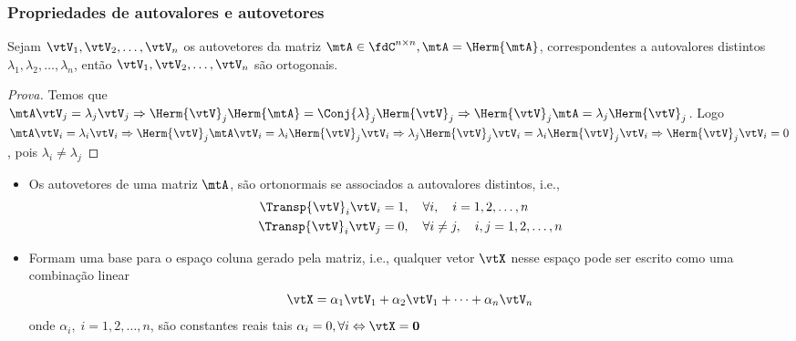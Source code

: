 \begin{frame}
  \frametitle{Propriedades de autovalores e autovetores}
  \vspace{-0.25\baselineskip}
  \begin{propriedade}
    Sejam  $\vtV_1, \vtV_2, \ldots, \vtV_n$ os autovetores da matriz $\mtA \in \fdC^{n \times n}, \mtA = \Herm{\mtA}$, correspondentes a autovalores distintos $\lambda_1, \lambda_2, \ldots, \lambda_n$, então $\vtV_1, \vtV_2, \ldots, \vtV_n$ são ortogonais.
  \end{propriedade}
  \vspace{-0.25\baselineskip}
  \begin{proof}[Prova]
    Temos que $\mtA \vtV_j = \lambda_j \vtV_j \Rightarrow \Herm{\vtV}_j \Herm{\mtA}  = \Conj{\lambda}_j \Herm{\vtV}_j \Rightarrow \Herm{\vtV}_j \mtA  = \lambda_j \Herm{\vtV}_j$. Logo \\
    $\mtA \vtV_i = \lambda_i \vtV_i \Rightarrow \Herm{\vtV}_j \mtA \vtV_i = \lambda_i \Herm{\vtV}_j \vtV_i \Rightarrow \lambda_j \Herm{\vtV}_j \vtV_i = \lambda_i \Herm{\vtV}_j \vtV_i \Rightarrow \Herm{\vtV}_j \vtV_i = 0$, pois $\lambda_i \neq \lambda_j$
  \end{proof}
  \begin{itemize}\footnotesize
    \item Os autovetores de uma matriz $\mtA$, são ortonormais se associados a autovalores distintos, i.e.,
      \begin{subequations}\label{u}
        \begin{align}
          \Transp{\vtV}_i\vtV_i &= 1, \quad \forall i, \quad i = 1,2,\ldots,n \label{eq_ortogonal}\\
          \Transp{\vtV}_i\vtV_j &= 0, \quad \forall i \neq j, \quad i,j = 1,2,\ldots,n \label{eq_normal}
        \end{align}
      \end{subequations}
    \item Formam uma base para o espaço coluna gerado pela matriz, i.e., qualquer vetor $\vtX$ nesse espaço pode ser escrito como uma combinação linear
    \begin{equation}\label{eq_comb_lin}
      \vtX = \alpha_1\vtV_1 + \alpha_2\vtV_1 + \cdots + \alpha_n\vtV_n
    \end{equation}
    onde $\alpha_i, \; i = 1,2,\ldots,n$, são constantes reais tais $\alpha_i = 0, \forall i \Leftrightarrow \vtX = \mathbf{0}$
  \end{itemize}
\end{frame}

